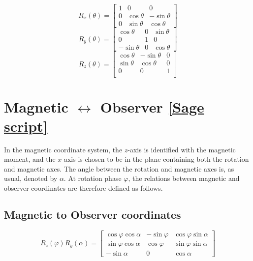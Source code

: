 \documentclass{book}
\newcommand{\phase}{\varphi}
\newcommand{\linktosage}[1]{\hyperref[#1]{[Sage script]}}
\begin{document}
\begin{equation}
    R_x(\theta) = \begin{bmatrix}
        1 & 0 & 0 \\
        0 & \cos\theta & -\sin\theta \\
        0 & \sin\theta & \cos\theta
    \end{bmatrix}
\end{equation}
\begin{equation}
    R_y(\theta) = \begin{bmatrix}
        \cos\theta & 0 & \sin\theta \\
        0 & 1 & 0 \\
        -\sin\theta & 0 & \cos\theta
    \end{bmatrix}
\end{equation}
\begin{equation}
    R_z(\theta) = \begin{bmatrix}
        \cos\theta & -\sin\theta & 0 \\
        \sin\theta & \cos\theta & 0 \\
        0 & 0 & 1 \\
    \end{bmatrix}
\end{equation}

\section{Magnetic $\leftrightarrow$ Observer \linktosage{sage:mag2obs}}

In the magnetic coordinate system, the $z$-axis is identified with the magnetic moment, and the $x$-axis is chosen to be in the plane containing both the rotation and magnetic axes.
The angle between the rotation and magnetic axes is, as usual, denoted by $\alpha$.
At rotation phase $\phase$, the relations between magnetic and observer coordinates are therefore defined as follows.

\subsection{Magnetic to Observer coordinates}
\begin{equation}
    R_z(\phase) R_y(\alpha) =
    \begin{bmatrix}
        \cos\phase\cos\alpha & -\sin\phase & \cos\phase\sin\alpha \\
        \sin\phase\cos\alpha &  \cos\phase & \sin\phase\sin\alpha \\
        -\sin\alpha          & 0           & \cos\alpha
    \end{bmatrix}
\end{equation}
\end{document}

